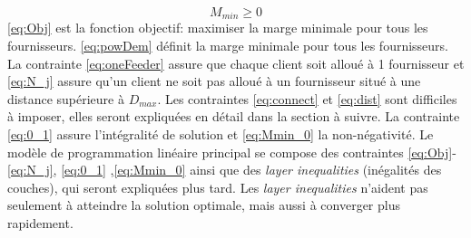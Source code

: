\documentclass[letterpaper]{article}
\begin{document}
\begin{equation}\label{eq:Mmin_0}
M_{min}\geq 0
\end{equation}
\eqref{eq:Obj} est la fonction objectif: maximiser la marge minimale pour tous les fournisseurs. \eqref{eq:powDem} définit la marge minimale pour tous les fournisseurs. La contrainte \eqref{eq:oneFeeder} assure que chaque client soit alloué à 1 fournisseur et \eqref{eq:N_j} assure qu'un client ne soit pas alloué à un fournisseur situé à une distance supérieure à $D_{max}$. Les contraintes \eqref{eq:connect} et \eqref{eq:dist} sont difficiles à imposer, elles seront expliquées en détail dans la section à suivre. La contrainte \eqref{eq:0_1} assure l'intégralité de solution et \eqref{eq:Mmin_0} la non-négativité.\newline \indent
Le modèle de programmation linéaire principal se compose des contraintes \eqref{eq:Obj}-\eqref{eq:N_j}, \eqref{eq:0_1} ,\eqref{eq:Mmin_0} ainsi que des \textit{layer inequalities} (inégalités des couches), qui seront expliquées plus tard. Les \textit{layer inequalities} n'aident pas seulement à atteindre la solution optimale, mais aussi à converger plus rapidement.
\end{document}
